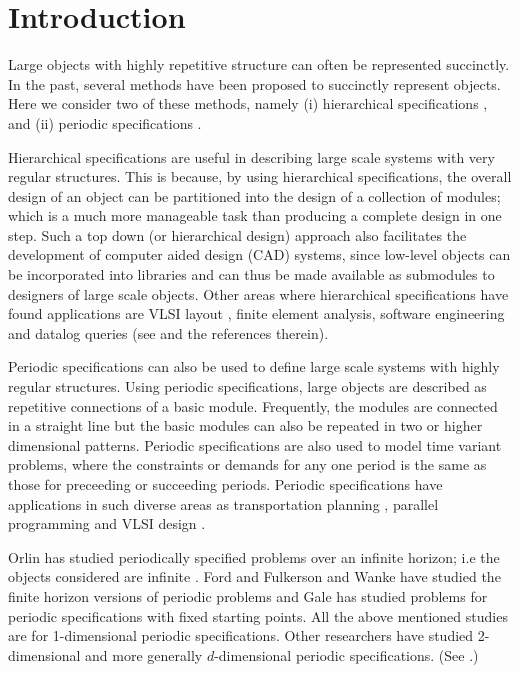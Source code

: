 \section{Introduction}
\label{sec:intro}

Large objects with highly repetitive structure can often be represented
succinctly.
In the past, several methods have been proposed to succinctly 
represent objects.
Here we consider two of these methods, namely
(i) hierarchical specifications  \cite{Ga82,GW83,LW92,BOW83,RH93},
and (ii) periodic specifications 
\cite{CM91,HW92,IS87,KO91,KS88,Or82a,Wa93}.
 


Hierarchical specifications are useful in describing large scale systems with
very regular structures. This is because, 
by using hierarchical specifications, the overall design of an object can be 
partitioned into the design of a collection of modules;
which is a 
much more manageable task than producing a complete design in one step.
Such a top down (or hierarchical design) approach 
also facilitates the development of computer aided design (CAD) systems, since
low-level objects can be  incorporated into libraries and can thus be made
available as submodules to designers of large scale  objects.
Other areas where hierarchical specifications have found applications are
VLSI layout \cite{HLW92,HW92,RH93},  
finite element analysis, software engineering and datalog queries 
(see \cite{HLW92,Ma94} and the references therein). 






Periodic specifications
can also be used to define large scale systems with highly regular structures.
Using  periodic specifications, 
large objects are  described as repetitive connections of a basic module.
Frequently, the modules are connected in a straight line 
but the basic modules can also  be repeated in two or higher
dimensional patterns. Periodic specifications are also used to 
model time variant  problems,  where the constraints
or demands  for any one period is the same as those for preceeding or 
succeeding periods. 
 Periodic specifications 
have applications in such diverse areas  as  transportation planning
\cite{Or82a,HLW92,Ma94},
parallel programming \cite{HLW92,KMW67} and 
VLSI design \cite{IS87,IS88}.

Orlin has studied periodically specified problems over an infinite 
horizon; i.e the objects considered are infinite \cite{Or82a}. 
Ford and Fulkerson \cite{FF58} and Wanke \cite{Wa93} have 
studied the finite horizon
versions of periodic problems and Gale \cite{Ga59} has studied problems for
periodic specifications with fixed starting points. All the above mentioned
studies are for 1-dimensional periodic specifications.
Other 
researchers have studied 2-dimensional and more generally $d$-dimensional
periodic specifications. (See  \cite{CM91,IS87,KO91,KS88,Wa93}.) 

